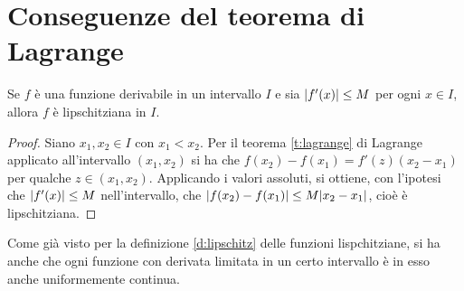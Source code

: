 \section{Conseguenze del teorema di Lagrange}
\begin{teorema}
Se $f$ è una funzione derivabile in un intervallo $I$ e sia $\lvert f'(x)\rvert\leq M$ per ogni $x\in I$, allora $f$ è lipschitziana in $I$.
\end{teorema}
\begin{proof}
Siano $x_1,x_2\in I$ con $x_1<x_2$. Per il teorema \ref{t:lagrange} di Lagrange applicato all'intervallo $(x_1,x_2)$ si ha che $f(x_2)-f(x_1)=f'(z)(x_2-x_1)$ per qualche $z\in (x_1,x_2)$. Applicando i valori assoluti, si ottiene, con l'ipotesi che $\lvert f'(x)\rvert\leq M$ nell'intervallo, che $\lvert f(x_2)-f(x_1)\rvert\leq M\lvert x_2-x_1\rvert$, cioè è lipschitziana.
\end{proof}
Come già visto per la definizione \ref{d:lipschitz} delle funzioni lispchitziane, si ha anche che ogni funzione con derivata limitata in un certo intervallo è in esso anche uniformemente continua.

